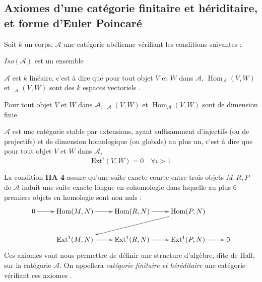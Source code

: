 \documentclass[12pt]{article}
\DeclareMathOperator{\Hom}{Hom}
\DeclareMathOperator{\ext}{Ext^{1}}
\theoremstyle{definition}
\begin{document}
\subsection{Axiomes d'une catégorie finitaire et hériditaire, et forme d'Euler Poincaré}
Soit $k$ un corps, $\mathcal{A}$ une catégorie abélienne vérifiant les conditions suivantes :
\begin{description}\label{HA}
\item[HA 1 :] $Iso(\mathcal{A})$ est un ensemble
\item[HA 2 :] $\mathcal{A}$ est $k$ linéaire, c'est à dire que pour tout objet $V$ et $W$ dans $\mathcal{A}$, $\Hom_{\mathcal{A}}(V,W)$ et  $\ext_{\mathcal{A}}(V,W)$ sont  des $k$ espaces vectoriels . 
\item[HA 3 :] Pour tout objet $V$ et $W$ dans $\mathcal{A}$, $\ext_{\mathcal{A}}(V,W)$ et $\Hom_{\mathcal{A}}(V,W)$ sont de dimension finie.
\item[HA 4 :] $\mathcal{A}$ est une catégorie stable par extensions, ayant suffisamment d'injectifs (ou de projectifs) et de dimension homologique (ou globale) au plus un, c'est à dire que pour tout objet $V$ et $W$ dans $\mathcal{A}$, $$\mbox{Ext}^i(V,W)=0\quad\forall i>1$$
\end{description}
La  condition \textbf{HA 4} assure qu'une suite exacte courte entre trois objets $M,R,P$ de $\mathcal{A}$ induit une suite exacte longue en cohomologie dans laquelle au plus 6 premiers objets en homologie sont non nuls : \begin{equation}\label{homexa}
 \xymatrix{
     0 \ar[r]  & \Hom(M,N) \ar[r] &\Hom(R,N)\ar[r] & \Hom(P,N)\ar[dll] \\
   & \ext(M,N)\ar[r]& \ext(R,N) \ar[r] & \ext(P,N) \ar[r] & 0} \\ 
   \end{equation}
Ces axiomes vont nous permettre de définir une structure d'algèbre, dite de Hall,  sur la catégorie $\mathcal{A}$. On appellera \textit{catégorie finitaire et héréditaire} une catégorie vérifiant  ces axiomes .\\\\
\end{document}
